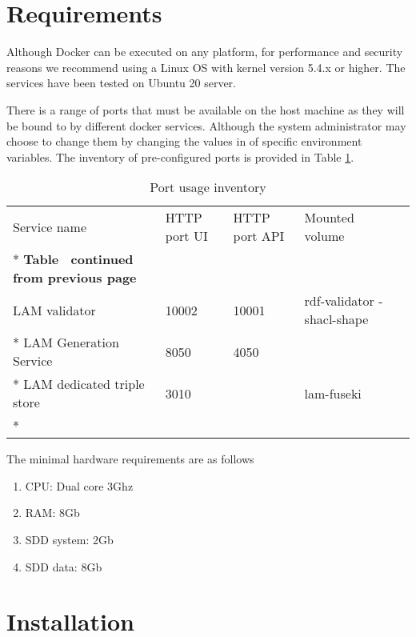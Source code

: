 \section{Requirements}
\label{sec:requirements}

Although Docker can be executed on any platform, for performance and security reasons we recommend using a Linux OS with kernel version 5.4.x or higher. The services have been tested on Ubuntu 20 server.

There is a range of ports that must be available on the host machine as they will be bound to by different docker services. Although the system administrator may choose to change them by changing the values in of specific environment variables. The inventory of pre-configured ports is provided in Table \ref{tab:port-inventory}.

\begin{longtable}[c]{@{}p{3.64cm}p{1.25cm}p{1.25cm}p{1.9cm}p{5cm}@{}}
	\toprule
	Service name  & HTTP port UI & HTTP port API & Mounted volume \\* \midrule
	\endfirsthead
	\multicolumn{5}{c}%
	{{\bfseries Table \thetable\ continued from previous page}}              \\
	\endhead
	\bottomrule
	\endfoot
	\endlastfoot
	LAM validator & 10002       & 10001          &     rdf-validator -shacl-shape          \\* \hline
	LAM Generation Service & 8050         & 4050               &                \\* \hline
	LAM dedicated triple store & 3010                 &          &    lam-fuseki            \\* \hline
	\caption{Port usage inventory}
	\label{tab:port-inventory}                                               \\
\end{longtable}

The minimal hardware requirements are as follows
\begin{enumerate}
	\item CPU: Dual core 3Ghz
	\item RAM: 8Gb
	\item SDD system: 2Gb
	\item SDD data: 8Gb 
\end{enumerate}

\section{Installation}
\label{sec:installation}

